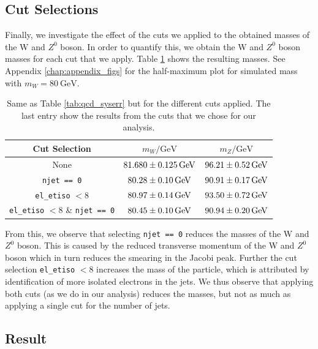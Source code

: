 \documentclass[a4paper]{report}
\numberwithin{equation}{section}
\begin{document}
 
\subsection{Cut Selections}

Finally, we investigate the effect of the cuts we applied to the obtained masses of the W and $Z^0$ boson. In order to quantify this, 
we obtain the W and $Z^0$ boson masses for each cut that we apply. Table \ref{tab:cut_syserr} shows the resulting masses. See Appendix \ref{chap:appendix_figs}
for the half-maximum plot for simulated mass with $m_W = \SI{80}{\giga\electronvolt}$. 

\begin{table}
    \centering
    \begin{tabular}{|c|c|c|} \hline
    Cut Selection &  $m_W / \si{\giga\electronvolt}$ & $m_Z / \si{\giga\electronvolt}$\\ \hline
    None & $\SI{81.68 \pm 0.125}{\giga\electronvolt}$ & $\SI{96.21 \pm 0.52}{\giga\electronvolt}$ \\ 
    \texttt{njet == 0} & $\SI{80.28 \pm 0.10}{\giga\electronvolt}$ & $\SI{90.91 \pm 0.17}{\giga\electronvolt}$ \\
    \texttt{el\_etiso} $< 8$ & $\SI{80.97 \pm 0.14}{\giga\electronvolt}$ & $\SI{93.50 \pm 0.72}{\giga\electronvolt}$ \\
    \texttt{el\_etiso} $< 8$ \& \texttt{njet == 0} & $\SI{80.45 \pm 0.10}{\giga\electronvolt} $ & $\SI{90.94 \pm 0.20}{\giga\electronvolt}$ \\ \hline
    \end{tabular}
    \caption{Same as Table \ref{tab:qcd_syserr} but for the different cuts applied. The last entry show the results from 
    the cuts that we chose for our analysis.}
    \label{tab:cut_syserr}
\end{table}

From this, we observe that selecting \texttt{njet == 0} reduces the masses of the W and $Z^0$ boson. This is caused by the reduced 
transverse momentum of the W and $Z^0$ boson which in turn reduces the smearing in the Jacobi peak. Further the cut selection 
\texttt{el\_etiso} $< 8$ increases the mass of the particle, which is attributed by identification of more isolated electrons in the 
jets. We thus observe that applying both cuts (as we do in our analysis) reduces the masses, but not as much as applying a single 
cut for the number of jets.

\subsection{Result}
\end{document}
